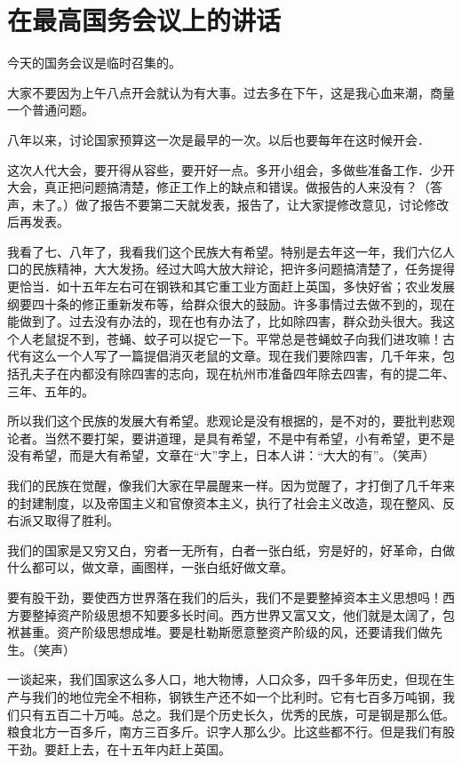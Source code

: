 \section[在最高国务会议上的讲话（一九五八年一月二十八日）]{在最高国务会议上的讲话}


今天的国务会议是临时召集的。

大家不要因为上午八点开会就认为有大事。过去多在下午，这是我心血来潮，商量一个普通问题。

八年以来，讨论国家预算这一次是最早的一次。以后也要每年在这时候开会．

这次人代大会，要开得从容些，要开好一点。多开小组会，多做些准备工作．少开大会，真正把问题搞清楚，修正工作上的缺点和错误。做报告的人来没有？（答声，未了。）做了报告不要第二天就发表，报告了，让大家提修改意见，讨论修改后再发表。

我看了七、八年了，我看我们这个民族大有希望。特别是去年这一年，我们六亿人口的民族精神，大大发扬。经过大鸣大放大辩论，把许多问题搞清楚了，任务提得更恰当．如十五年左右可在钢铁和其它重工业方面赶上英国，多快好省；农业发展纲要四十条的修正重新发布等，给群众很大的鼓励。许多事情过去做不到的，现在能做到了。过去没有办法的，现在也有办法了，比如除四害，群众劲头很大。我这个人老鼠捉不到，苍蝇、蚊子可以捉它一下。平常总是苍蝇蚊子向我们进攻嘛！古代有这么一个人写了一篇提倡消灭老鼠的文章。现在我们要除四害，几千年来，包括孔夫子在内都没有除四害的志向，现在杭州市准备四年除去四害，有的提二年、三年、五年的。

所以我们这个民族的发展大有希望。悲观论是没有根据的，是不对的，要批判悲观论者。当然不要打架，要讲道理，是具有希望，不是中有希望，小有希望，更不是没有希望，而是大有希望，文章在“大”字上，日本人讲：“大大的有”。（笑声）

我们的民族在觉醒，像我们大家在早晨醒来一样。因为觉醒了，才打倒了几千年来的封建制度，以及帝国主义和官僚资本主义，执行了社会主义改造，现在整风、反右派又取得了胜利。

我们的国家是又穷又白，穷者一无所有，白者一张白纸，穷是好的，好革命，白做什么都可以，做文章，画图样，一张白纸好做文章。

要有股干劲，要使西方世界落在我们的后头，我们不是要整掉资本主义思想吗！西方要整掉资产阶级思想不知要多长时间。西方世界又富又文，他们就是太阔了，包袱甚重。资产阶级思想成堆。要是杜勒斯愿意整资产阶级的风，还要请我们做先生。（笑声）

一谈起来，我们国家这么多人口，地大物博，人口众多，四千多年历史，但现在生产与我们的地位完全不相称，钢铁生产还不如一个比利时。它有七百多万吨钢，我们只有五百二十万吨。总之。我们是个历史长久，优秀的民族，可是钢是那么低。粮食北方一百多斤，南方三百多斤。识字人那么少。比这些都不行。但是我们有股干劲。要赶上去，在十五年内赶上英国。

